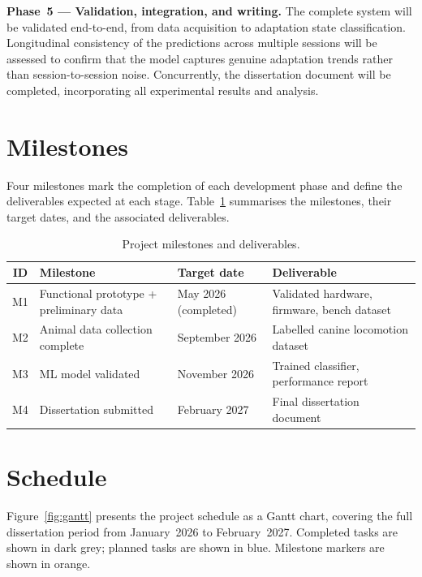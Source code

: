 \textbf{Phase~5 — Validation, integration, and writing.}
The complete system will be validated end-to-end, from data acquisition to
adaptation state classification.
Longitudinal consistency of the predictions across multiple sessions will be
assessed to confirm that the model captures genuine adaptation trends rather
than session-to-session noise.
Concurrently, the dissertation document will be completed, incorporating all
experimental results and analysis.

\section{Milestones}
\label{section:milestones}

Four milestones mark the completion of each development phase and define the
deliverables expected at each stage.
Table~\ref{tab:milestones} summarises the milestones, their target dates, and
the associated deliverables.

\begin{table}[h]
  \centering
  \caption{Project milestones and deliverables.}
  \label{tab:milestones}
  \begin{tabular}{clll}
    \toprule
    \textbf{ID} & \textbf{Milestone} & \textbf{Target date} & \textbf{Deliverable} \\
    \midrule
    M1 & Functional prototype + preliminary data
       & May 2026 (completed)
       & Validated hardware, firmware, bench dataset \\
    M2 & Animal data collection complete
       & September 2026
       & Labelled canine locomotion dataset \\
    M3 & ML model validated
       & November 2026
       & Trained classifier, performance report \\
    M4 & Dissertation submitted
       & February 2027
       & Final dissertation document \\
    \bottomrule
  \end{tabular}
\end{table}

\section{Schedule}
\label{section:schedule}

Figure~\ref{fig:gantt} presents the project schedule as a Gantt chart,
covering the full dissertation period from January~2026 to February~2027.
Completed tasks are shown in dark grey; planned tasks are shown in blue.
Milestone markers are shown in orange.

